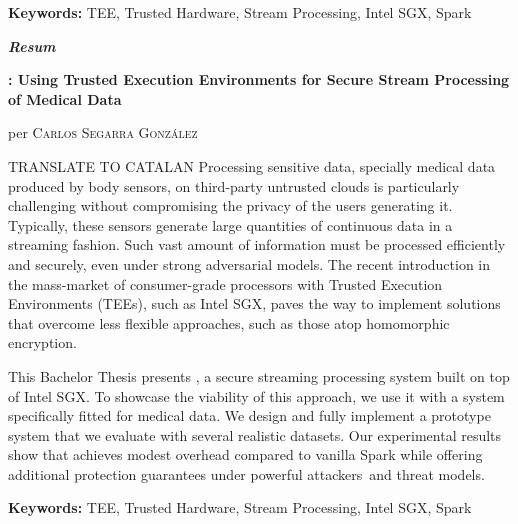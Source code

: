 \vspace{0.5cm}

\textbf{Keywords:} TEE, Trusted Hardware, Stream Processing, Intel SGX, Spark

\vfill
\pagebreak

\vspace*{2cm}
\begin{center}
%
%
%
%
%
%    
%
    \LARGE
    \textit{\textbf{Resum}} 

    \vspace{0.5cm}

    \large
    \textbf{\projName: Using Trusted Execution Environments for Secure Stream Processing of Medical Data}

    per \textsc{Carlos Segarra Gonz\'alez}
\end{center}

\vspace{0.5cm}

\normalsize
TRANSLATE TO CATALAN %
Processing sensitive data, specially medical data produced by body sensors, on third-party untrusted clouds is particularly challenging without compromising the privacy of the users generating it. Typically, these sensors generate large quantities of continuous data in a streaming fashion. Such vast amount of information must be processed efficiently and securely, even under strong adversarial models. The recent introduction in the mass-market of consumer-grade processors with Trusted Execution Environments (TEEs), such as Intel SGX, paves the way to implement solutions that overcome less flexible approaches, such as those atop homomorphic encryption. 
    
This Bachelor Thesis presents \projName, a secure streaming processing system built on top of Intel SGX. To showcase the viability of this approach, we use it with a system specifically fitted for medical data. We design and fully implement a prototype system that we evaluate with several realistic datasets. Our experimental results show that \projName achieves modest overhead compared to vanilla Spark while offering additional protection guarantees under powerful attackers and threat models.

\vspace{0.5cm}

\textbf{Keywords:} TEE, Trusted Hardware, Stream Processing, Intel SGX, Spark

\vfill
